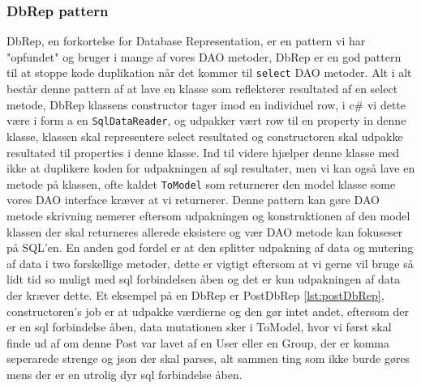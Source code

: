 \subsubsection{DbRep pattern}\label{sec:dbRep}
DbRep, en forkortelse for Database Representation, er en pattern vi har "opfundet" og bruger i mange af vores DAO metoder, DbRep er en god pattern til at stoppe kode duplikation når det kommer til \texttt{select} DAO metoder.
Alt i alt består denne pattern af at lave en klasse som reflekterer resultated af en select metode, DbRep klassens constructor tager imod en individuel row, i c\# vi dette være i form a en \texttt{SqlDataReader}, og udpakker vært row til en property in denne klasse, klassen skal representere select resultated og constructoren skal udpakke resultated til properties i denne klasse.
Ind til videre hjælper denne klasse med ikke at duplikere koden for udpakningen af sql resultater, men vi kan også lave en metode på klassen, ofte kaldet \texttt{ToModel} som returnerer den model klasse some vores DAO interface kræver at vi returnerer.
Denne pattern kan gøre DAO metode skrivning nemerer eftersom udpakningen og konstruktionen af den model klassen der skal returneres allerede eksistere og vær DAO metode kan fokuseser på SQL'en.
En anden god fordel er at den splitter udpakning af data og mutering af data i two forskellige metoder, dette er vigtigt eftersom at vi gerne vil bruge så lidt tid so muligt med sql forbindelsen åben og det er kun udpakningen af data der kræver dette.
Et eksempel på en DbRep er PostDbRep \ref{lst:postDbRep}, constructoren's job er at udpakke værdierne og den gør intet andet, eftersom der er en sql forbindelse åben, data mutationen sker i ToModel, hvor vi først skal finde ud af om denne Post var lavet af en User eller en Group, der er komma seperarede strenge og json der skal parses, alt sammen ting som ikke burde gøres mens der er en utrolig dyr sql forbindelse åben.

